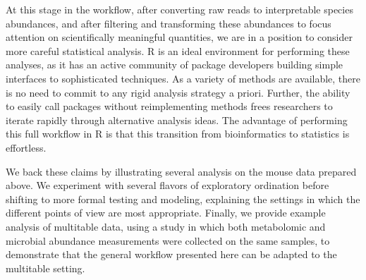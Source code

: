 At this stage in the workflow, after converting raw reads to
interpretable species abundances, and after filtering and transforming
these abundances to focus attention on scientifically meaningful
quantities, we are in a position to consider more careful statistical
analysis. R is an ideal environment for performing these analyses, as
it has an active community of package developers building simple
interfaces to sophisticated techniques. As a variety of methods are
available, there is no need to commit to any rigid analysis strategy a
priori. Further, the ability to easily call packages without
reimplementing methods frees researchers to iterate rapidly through
alternative analysis ideas. The advantage of performing this full
workflow in R is that this transition from bioinformatics to
statistics is effortless.

We back these claims by illustrating several analysis on the mouse
data prepared above. We experiment with several flavors of exploratory
ordination before shifting to more formal testing and modeling,
explaining the settings in which the different points of view are most
appropriate. Finally, we provide example analysis of multitable data,
using a study in which both metabolomic and microbial abundance
measurements were collected on the same samples, to demonstrate that
the general workflow presented here can be adapted to the multitable
setting.



